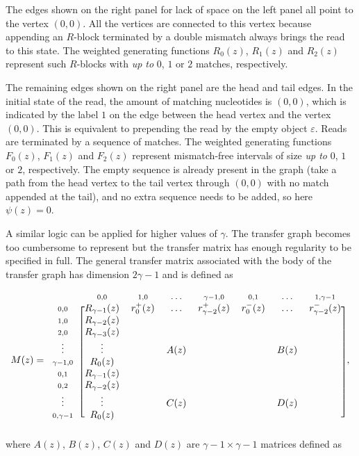 \documentclass{article}
\begin{document}
The edges shown on the right panel for lack of space on the left panel all
point to the vertex $(0,0)$. All the vertices are connected to this vertex
because appending an $R$-block terminated by a double mismatch always
brings the read to this state. The weighted generating functions $R_0(z)$,
$R_1(z)$ and $R_2(z)$ represent such $R$-blocks with \emph{up to} $0$, $1$
or $2$ matches, respectively.

The remaining edges shown on the right panel are the head and tail edges.
In the initial state of the read, the amount of matching nucleotides is
$(0,0)$, which is indicated by the label $1$ on the edge between the head
vertex and the vertex $(0,0)$. This is equivalent to prepending the read
by the empty object $\varepsilon$. Reads are terminated by a sequence of
matches. The weighted generating functions $F_0(z)$, $F_1(z)$ and $F_2(z)$
represent mismatch-free intervals of size \emph{up to} $0$, $1$ or $2$,
respectively. The empty sequence is already present in the graph (take a
path from the head vertex to the tail vertex through $(0,0)$ with no match
appended at the tail), and no extra sequence needs to be added, so here
$\psi(z) = 0$.

A similar logic can be applied for higher values of $\gamma$. The transfer
graph becomes too cumbersome to represent but the transfer matrix has
enough regularity to be specified in full. The general transfer matrix
associated with the body of the transfer graph has dimension $2\gamma-1$
and is defined as


\begin{equation*}
M(z) =
\begin{blockarray}{cccccccc}
   & \scriptstyle{0,0} & \scriptstyle{1,0} & 
    \ldots & \scriptstyle{\gamma-1,0} &
    \scriptstyle{0,1} & \ldots &
    \scriptstyle{1,\gamma-1}\\
\begin{block}{c[ccccccc]}
\scriptstyle{0,0} & R_{\gamma-1}(z)  & r_0^+(z) & \ldots &
    r_{\gamma-2}^+(z) & r_0^-(z) & \ldots & r_{\gamma-2}^-(z) \\
\scriptstyle{1,0} & R_{\gamma-2}(z) \\
\scriptstyle{2,0} & R_{\gamma-3}(z) \\
\vdots & \vdots & & A(z) & & & B(z) \\
\scriptstyle{\gamma-1,0} & R_0(z) \\
\scriptstyle{0,1} & R_{\gamma-1}(z) \\
\scriptstyle{0,2} & R_{\gamma-2}(z) \\
\vdots & \vdots & & C(z) & & & D(z) \\
\scriptstyle{0,\gamma-1} & R_0(z) \\
\end{block}
\end{blockarray},
\end{equation*}
where $A(z)$, $B(z)$, $C(z)$ and $D(z)$ are $\gamma-1 \times \gamma-1$
matrices defined as
\end{document}
